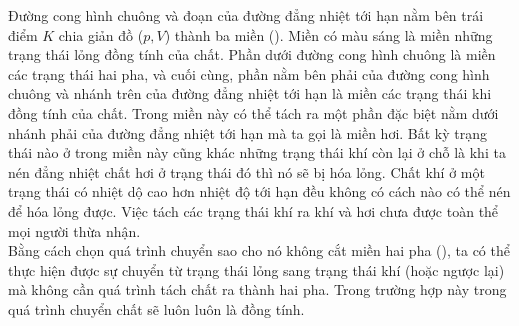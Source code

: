 Đường cong hình chuông và đoạn của đường đẳng nhiệt tới hạn nằm bên trái điểm $K$ chia giản đồ ($p,V$) thành ba miền (). Miền có màu sáng là miền những trạng thái lỏng đồng tính của chất. Phần dưới đường cong hình chuông là miền các trạng thái hai pha, và cuối cùng, phần nằm bên phải của đường cong hình chuông và nhánh trên của đường đẳng nhiệt tới hạn là miền các trạng thái khi đồng tính của chất. Trong miền này có thể tách ra một phần đặc biệt nằm dưới nhánh phải của đường đẳng nhiệt tới hạn mà ta gọi là miền hơi. Bất kỳ trạng thái nào ở trong miền này cũng khác những trạng thái khí còn lại ở chỗ là khi ta nén đẳng nhiệt chất hơi ở trạng thái đó thì nó sẽ bị hóa lỏng. Chất khí ở một trạng thái có nhiệt dộ cao hơn nhiệt độ tới hạn đều không có cách nào có thể nén để hóa lỏng được. Việc tách các trạng thái khí ra khí và hơi chưa được toàn thể mọi người thừa nhận.\\

Bằng cách chọn quá trình chuyển sao cho nó không cắt miền hai pha (), ta có thể thực hiện được sự chuyển từ trạng thái lỏng sang trạng thái khí (hoặc ngược lại) mà không cần quá trình tách chất ra thành hai pha. Trong trường hợp này trong quá trình chuyển chất sẽ luôn luôn là đồng tính.

